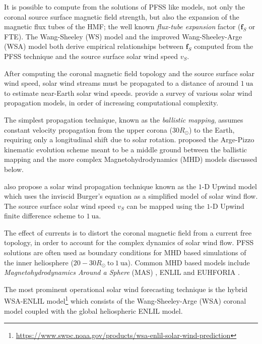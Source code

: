 It is possible to compute from the solutions of PFSS like models, not only the coronal source 
surface magnetic field strength, but also the expansion of the magnetic flux tubes of the HMF; 
the well known \emph{flux-tube expansion} factor ($\mathbf{f}_S$ or FTE). The Wang-Sheeley (WS) 
model \citep{WSAModel} and the improved Wang-Sheeley-Arge (WSA) model 
\citep{arge2000improvement,arge2004stream} both derive empirical relationships between 
$\mathbf{f}_S$ computed from the PFSS technique and the source surface solar wind speed $v_S$.  

After computing the coronal magnetic field topology and the source surface solar wind speed, 
solar wind streams must be propagated to a distance of around $\SI{1}{\astronomicalunit}$ to 
estimate near-Earth solar wind speeds. \citet{Riley2011} provide a survey of various solar wind 
propagation models, in order of increasing computational complexity. 

The simplest propagation technique, known as the \emph{ballistic mapping}, assumes constant 
velocity propagation from the upper corona ($30R_{\odot}$) to the Earth, requiring only a 
longitudinal shift due to solar rotation. \citet{arge2000improvement} proposed the Arge-Pizzo 
kinematic evolution scheme meant to be a middle ground between the ballistic mapping and the more 
complex Magnetohydrodynamics (MHD) models discussed below.

\citet{Riley2011} also propose a solar wind propagation technique known as the 
$1\textrm{-}\text{D}$ Upwind model which uses the inviscid Burger's equation as a simplified model 
of solar wind flow. The source surface solar wind speed $v_S$ can be mapped using the 
$1\textrm{-}\text{D}$ Upwind finite difference scheme to $\SI{1}{\astronomicalunit}$.

The effect of currents is to distort the coronal magnetic field from a current free topology, 
in order to account for the complex dynamics of solar wind flow. PFSS solutions are often used as 
boundary conditions for MHD based simulations of the inner heliosphere 
($20-30 R_{\odot} \ \mathrm{to} \ \SI{1}{\astronomicalunit}$). Common MHD based models include 
\emph{Magnetohydrodynamics Around a Sphere} (MAS) \citep{linker1999magnetohydrodynamic}, ENLIL 
\citep{ODSTRCIL1996,ODSTRCIL1999a,ODSTRCIL1999b,ODSTRCIL2003,ODSTRCIL2004} and EUHFORIA 
\citep{pomoell2018euhforia}. 

The most prominent operational solar wind forecasting technique is the hybrid WSA-ENLIL 
model\footnote{\url{https://www.swpc.noaa.gov/products/wsa-enlil-solar-wind-prediction}} which 
consists of the Wang-Sheeley-Arge (WSA) coronal model coupled with the global heliospheric ENLIL 
model. 


